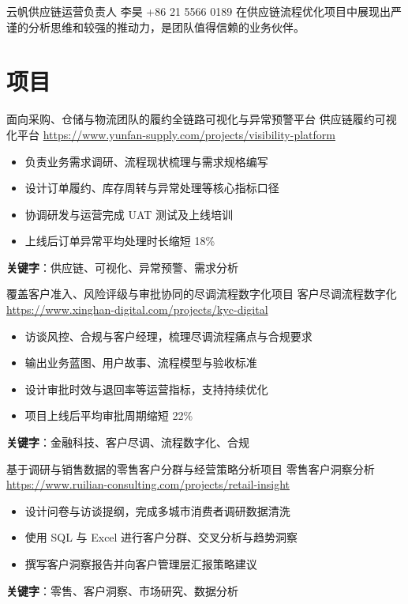 \documentclass[a4paper, serif, 10pt]{moderncv}
\begin{document}
        {云帆供应链运营负责人}
        {李昊}
        {+86 21 5566 0189}
        {}
        {在供应链流程优化项目中展现出严谨的分析思维和较强的推动力，是团队值得信赖的业务伙伴。}
\section{项目}

        {面向采购、仓储与物流团队的履约全链路可视化与异常预警平台}
        {供应链履约可视化平台}
        {\url{https://www.yunfan-supply.com/projects/visibility-platform}}
        {}
        {\begin{itemize}
\item 负责业务需求调研、流程现状梳理与需求规格编写
\item 设计订单履约、库存周转与异常处理等核心指标口径
\item 协调研发与运营完成 UAT 测试及上线培训
\item 上线后订单异常平均处理时长缩短 18\%
\end{itemize}
\textbf{关键字}：供应链、可视化、异常预警、需求分析}

        {覆盖客户准入、风险评级与审批协同的尽调流程数字化项目}
        {客户尽调流程数字化}
        {\url{https://www.xinghan-digital.com/projects/kyc-digital}}
        {}
        {\begin{itemize}
\item 访谈风控、合规与客户经理，梳理尽调流程痛点与合规要求
\item 输出业务蓝图、用户故事、流程模型与验收标准
\item 设计审批时效与退回率等运营指标，支持持续优化
\item 项目上线后平均审批周期缩短 22\%
\end{itemize}
\textbf{关键字}：金融科技、客户尽调、流程数字化、合规}

        {基于调研与销售数据的零售客户分群与经营策略分析项目}
        {零售客户洞察分析}
        {\url{https://www.ruilian-consulting.com/projects/retail-insight}}
        {}
        {\begin{itemize}
\item 设计问卷与访谈提纲，完成多城市消费者调研数据清洗
\item 使用 SQL 与 Excel 进行客户分群、交叉分析与趋势洞察
\item 撰写客户洞察报告并向客户管理层汇报策略建议
\end{itemize}
\textbf{关键字}：零售、客户洞察、市场研究、数据分析}
\end{document}
